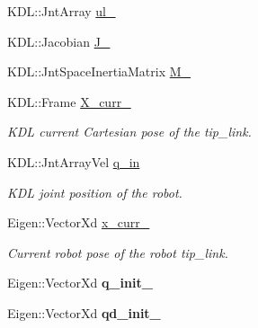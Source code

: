\begin{DoxyCompactItemize}
\item 
K\+D\+L\+::\+Jnt\+Array \hyperlink{classrobot_1_1_robot_model_a07cbbd47203b418113b66d8ae2b4a6f6}{ul\+\_\+}
\item 
K\+D\+L\+::\+Jacobian \hyperlink{classrobot_1_1_robot_model_a6f76e9a06f0c7b947f169cc6ea511c99}{J\+\_\+}
\item 
K\+D\+L\+::\+Jnt\+Space\+Inertia\+Matrix \hyperlink{classrobot_1_1_robot_model_a1c4bb1ca99151242332f816472c10f94}{M\+\_\+}
\item 
K\+D\+L\+::\+Frame \hyperlink{classrobot_1_1_robot_model_a94479ee0713f64be16b8a92c8bb8a044}{X\+\_\+curr\+\_\+}
\begin{DoxyCompactList}\small\item\em K\+DL current Cartesian pose of the tip\+\_\+link. \end{DoxyCompactList}\item 
\mbox{\label{classrobot_1_1_robot_model_a1556ddcb4f7966858761f2ddd5f37b77}} 
K\+D\+L\+::\+Jnt\+Array\+Vel \hyperlink{classrobot_1_1_robot_model_a1556ddcb4f7966858761f2ddd5f37b77}{q\+\_\+in}
\begin{DoxyCompactList}\small\item\em K\+DL joint position of the robot. \end{DoxyCompactList}\item 
\mbox{\label{classrobot_1_1_robot_model_ae663aa6cce666959189a7faa96411cc0}} 
Eigen\+::\+Vector\+Xd \hyperlink{classrobot_1_1_robot_model_ae663aa6cce666959189a7faa96411cc0}{x\+\_\+curr\+\_\+}
\begin{DoxyCompactList}\small\item\em Current robot pose of the robot tip\+\_\+link. \end{DoxyCompactList}\item 
\mbox{\label{classrobot_1_1_robot_model_a5b6f8cf7d4f5e837494b5097c872ff81}} 
Eigen\+::\+Vector\+Xd {\bfseries q\+\_\+init\+\_\+}
\item 
\mbox{\label{classrobot_1_1_robot_model_ab755b00435651e259e948e5f10fb1a7c}} 
Eigen\+::\+Vector\+Xd {\bfseries qd\+\_\+init\+\_\+}
\item 
\mbox{\label{classrobot_1_1_robot_model_a12e2c01b76bd26b300bd51fc70e69c10}} 

\end{DoxyCompactItemize}
